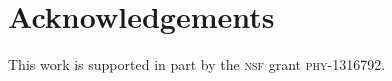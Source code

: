 \documentclass[12pt]{article}
\numberwithin{equation}{section}    %
\begin{document}





\section*{Acknowledgements}


This work is supported in part by the \textsc{nsf} grant \textsc{phy}-1316792. 
%


%  
% 
\end{document}
